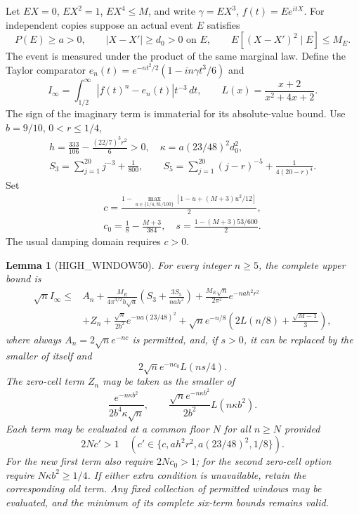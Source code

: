 \documentclass[11pt,a4paper]{article}
\numberwithin{equation}{section}
\newtheorem{lemma}[theorem]{Lemma}
\theoremstyle{definition}
\theoremstyle{remark}
\begin{document}
Let $EX=0$, $EX^2=1$, $EX^4\le M$, and write
$\gamma=EX^3$, $f(t)=Ee^{itX}$. For independent copies suppose an
actual event $E$ satisfies
\[
 P(E)\ge a>0,\qquad |X-X'|\ge d_0>0\text{ on }E,\qquad
 E[(X-X')^2\mid E]\le M_E.
\]
The event is measured under the product of the same marginal law.
Define the Taylor comparator
$e_n(t)=e^{-nt^2/2}(1-in\gamma t^3/6)$ and
\[
 I_\infty=\int_{1/2}^{\infty}|f(t)^n-e_n(t)|t^{-3}\,dt,
 \qquad L(x)=\frac{x+2}{x^2+4x+2}.
\]
The sign of the imaginary term is immaterial for its absolute-value bound.
Use $b=9/10$, $0<r\le1/4$,
\begin{gather*}
 h=\frac{333}{106}-\frac{(22/7)^3r^2}{6}>0,\quad
 \kappa=a(23/48)^2d_0^2,\\
 S_3=\sum_{j=1}^{20}j^{-3}+\frac1{800},\qquad
 S_5=\sum_{j=1}^{20}(j-r)^{-5}+\frac1{4(20-r)^4}.
\end{gather*}
Set
\[
 \begin{gathered}c=\frac{1-\max_{u\in\{1/4,81/100\}}
              [1-u+(M+3)u^2/12]}2,\\
 c_0=\frac18-\frac{M+3}{384},\quad
 s=\frac{1-(M+3)53/600}{2}.\end{gathered}
\]
The usual damping domain requires $c>0$.

\begin{lemma}[HIGH\_WINDOW50]
For every integer $n\ge5$, the complete upper bound is
\begin{align*}
 \sqrt n I_\infty\le{}& A_n
 +\frac{M_E}{4\pi^{3/2}h\sqrt a}
       \left(S_3+\frac{3S_5}{nah^2}\right)
 +\frac{M_E\sqrt n}{2\pi^2}e^{-nah^2r^2}\\
 &+Z_n+\frac{\sqrt n}{2b^2}e^{-na(23/48)^2}
 +\sqrt n e^{-n/8}\left(2L(n/8)+\frac{\sqrt{M-1}}3\right),
\end{align*}
where always $A_n=2\sqrt n e^{-nc}$ is permitted, and, if $s>0$,
it can be replaced by the smaller of itself and
\[
 2\sqrt n e^{-nc_0}L(ns/4).
\]
The zero-cell term $Z_n$ may be taken as the smaller of
\[
 \frac{e^{-n\kappa b^2}}{2b^4\kappa\sqrt n},\qquad
 \frac{\sqrt n e^{-n\kappa b^2}}{2b^2}L(n\kappa b^2).
\]
Each term may be evaluated at a common floor $N$ for all $n\ge N$
provided
\[
 2Nc'>1\quad(c'\in\{c,ah^2r^2,a(23/48)^2,1/8\}).
\]
For the new first term also require $2Nc_0>1$;
for the second zero-cell option require $N\kappa b^2\ge1/4$.
If either extra condition is unavailable, retain the corresponding old term.
Any fixed collection of permitted windows may be evaluated, and the minimum
of its complete six-term bounds remains valid.
\end{lemma}
\end{document}
